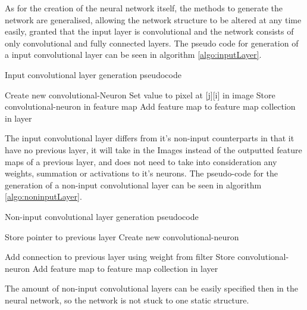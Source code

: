 \documentclass[10pt]{article}
\begin{document}
	As for the creation of the neural network itself, the methods to generate the network are generalised, allowing the network structure to be altered at any time easily, granted that the input layer is convolutional and the network consists of only convolutional and fully connected layers. The pseudo code for generation of a input convolutional layer can be seen in algorithm \ref{algo:inputLayer}.\\
		
		\begin{algorithm}[h]
			\caption{Input convolutional layer generation pseudocode}
			\label{algo:inputLayer}
			\begin{algorithmic}[1]
							\State Create new convolutional-Neuron
							\State Set value to pixel at [j][i] in image
							\State Store convolutional-neuron in feature map
						\EndFor
					\EndFor
					\State Add feature map to feature map collection in layer
				\EndFor
				\EndProcedure
			\end{algorithmic}
		\end{algorithm}
		
		The input convolutional layer differs from it's non-input counterparts in that it have no previous layer, it will take in the Images instead of the outputted feature maps of a previous layer, and does not need to take into consideration any weights, summation or activations to it's neurons. The pseudo-code for the generation of a non-input convolutional layer can be seen in algorithm \ref{algo:noninputLayer}.\\
		
		\begin{algorithm}[h]
			\caption{Non-input convolutional layer generation pseudocode}
			\label{algo:noninputLayer}
			\begin{algorithmic}[1]
				\State Store pointer to previous layer
								\State Create new convolutional-neuron
								
										\State Add connection to previous layer using weight from filter										
									\EndFor									
								\EndFor
								\State Store convolutional-neuron
							\EndFor							
						\EndFor
						\State Add feature map to feature map collection in layer
					\EndFor					
				\EndFor
				
				\EndProcedure
			\end{algorithmic}
		\end{algorithm}
		The amount of non-input convolutional layers can be easily specified then in the neural network, so the network is not stuck to one static structure.\\		
		
\end{document}
